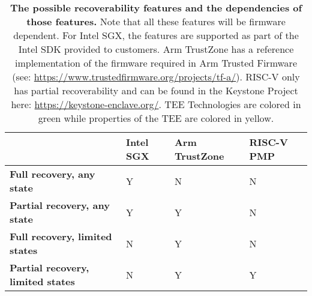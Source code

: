 \begin{table*}[p]
\begin{center}
\begin{tabular}{|L{3cm}|L{3.25cm}|L{3.25cm}|L{3.25cm}|}
\hline
\textbf{}  & \textbf{Intel SGX} & \textbf{Arm TrustZone} & \textbf{RISC-V PMP} \\ \hline
{}\textbf{Full recovery, any state} & Y & N     & N  \\ \hline
{}\textbf{Partial recovery, any state}      & Y & Y     & N  \\ \hline
{}\textbf{Full recovery, limited states}    & N & Y     & N  \\ \hline
{}\textbf{Partial recovery, limited states} & N & Y     & Y  \\ \hline
\end{tabular}
\end{center}
\caption[Recoverability Comparison]{\textbf{The possible recoverability features and the dependencies of those features.} Note that all these features will be firmware dependent. For Intel SGX, the features are supported as part of the Intel SDK provided to customers. Arm TrustZone has a reference implementation of the firmware required in Arm Trusted Firmware (see: \url{https://www.trustedfirmware.org/projects/tf-a/}). RISC-V only has partial recoverability and can be found in the Keystone Project here: \url{https://keystone-enclave.org/}. TEE Technologies are colored in \colorbox{tbl-gre}{green} while properties of the TEE are colored in \colorbox{tbl-yel}{yellow}.}
\label{tab:recover-compare}
\end{table*}

